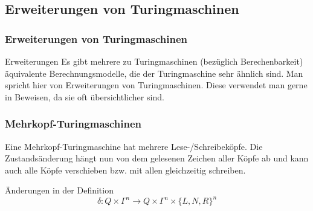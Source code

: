 \subsection{Erweiterungen von Turingmaschinen}
\begin{frame}
\frametitle{Erweiterungen von Turingmaschinen}
\begin{block}{Erweiterungen}
Es gibt mehrere zu Turingmaschinen (bezüglich Berechenbarkeit) äquivalente Berechnungsmodelle, die der Turingmaschine sehr ähnlich sind. Man spricht hier von Erweiterungen von Turingmaschinen. Diese verwendet man gerne in Beweisen, da sie oft übersichtlicher sind.
\end{block}
\end{frame}
\begin{frame}
\frametitle{Mehrkopf-Turingmaschinen}
\begin{figure}[H]
\begin{center}
\end{center}
\end{figure}
Eine Mehrkopf-Turingmaschine hat mehrere Lese-/Schreibeköpfe. Die Zustandsänderung hängt nun von dem gelesenen Zeichen aller Köpfe ab und kann auch alle Köpfe verschieben bzw. mit allen gleichzeitig schreiben.
\begin{block}{Änderungen in der Definition}
$$ \delta: Q \times \Gamma^n \rightarrow Q \times \Gamma^n \times \{L,N,R\}^n$$
\end{block}
\end{frame}

